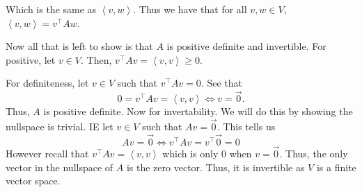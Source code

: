 \documentclass[answers]{exam}
\newcommand{\ip}[1]{\left\langle#1\right\rangle}
\begin{document}
\begin{questions}
\begin{parts}
\begin{solution}
            Which is the same as $\ip{v,w}$. Thus we have that for all $v,w\in V$, $\ip{v,w} = v^\top Aw$.

            Now all that is left to show is that $A$ is positive definite and invertible. For positive, let $v\in V$. Then, $v^\top Av = \ip{v,v} \geq 0$.

            For definiteness, let $v\in V$ such that $v^\top Av = 0$. See that
            \[
                0 = v^\top Av = \ip{v,v} \iff v = \vec{0}.
            \]
            Thus, $A$ is positive definite. Now for invertability. We will do this by showing the nullspace
            is trivial. IE let $v\in V$ such that $Av = \vec{0}$. This tells us
            \[
                Av = \vec{0} \iff v^\top Av = v^\top\vec{0} = 0
            \]
            However recall that $v^\top Av = \ip{v,v}$ which is only $0$ when $v = \vec{0}$. Thus, the only
            vector in the nullspace of $A$ is the zero vector. Thus, it is invertible as $V$ is a finite vector
            space.


\end{solution}
\end{parts}
\end{questions}
\end{document}
